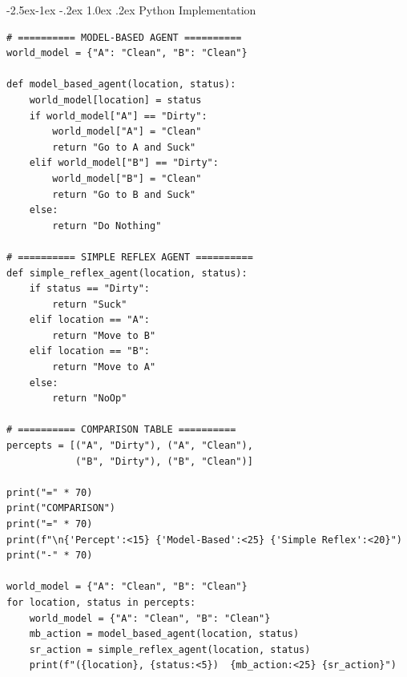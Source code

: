 \documentclass[12pt,a4paper]{article}
\makeatletter
\renewcommand{\subsection}{\@startsection{subsection}{2}{\z@}%
  {-2.5ex\@plus -1ex \@minus -.2ex}%
  {1.0ex \@plus .2ex}%
  {\normalfont\large\bfseries\color{accentblue}}}
\makeatother
\begin{document}
\subsection{Python Implementation}
\begin{lstlisting}[style=python, caption={Comparison of both agents}]
# ========== MODEL-BASED AGENT ==========
world_model = {"A": "Clean", "B": "Clean"}

def model_based_agent(location, status):
    world_model[location] = status
    if world_model["A"] == "Dirty":
        world_model["A"] = "Clean"
        return "Go to A and Suck"
    elif world_model["B"] == "Dirty":
        world_model["B"] = "Clean"
        return "Go to B and Suck"
    else:
        return "Do Nothing"

# ========== SIMPLE REFLEX AGENT ==========
def simple_reflex_agent(location, status):
    if status == "Dirty":
        return "Suck"
    elif location == "A":
        return "Move to B"
    elif location == "B":
        return "Move to A"
    else:
        return "NoOp"

# ========== COMPARISON TABLE ==========
percepts = [("A", "Dirty"), ("A", "Clean"),
            ("B", "Dirty"), ("B", "Clean")]

print("=" * 70)
print("COMPARISON")
print("=" * 70)
print(f"\n{'Percept':<15} {'Model-Based':<25} {'Simple Reflex':<20}")
print("-" * 70)

world_model = {"A": "Clean", "B": "Clean"}
for location, status in percepts:
    world_model = {"A": "Clean", "B": "Clean"}
    mb_action = model_based_agent(location, status)
    sr_action = simple_reflex_agent(location, status)
    print(f"({location}, {status:<5})  {mb_action:<25} {sr_action}")
\end{lstlisting}
\end{document}
